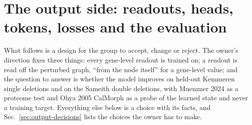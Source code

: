 
\section{The output side: readouts, heads, tokens, losses and the evaluation}
\label{sec:output}

What follows is a design for the group to accept, change or reject. The owner's direction
fixes three things: every gene-level readout is trained on; a readout is read off the
perturbed graph, ``from the node itself'' for a gene-level value; and the question to
answer is whether the model improves on held-out Kemmeren single deletions and on the
Sameith double deletions, with Muenzner 2024 as a proteome test and Ohya 2005 CalMorph as a
probe of the learned state and never a training target. Everything else below is a choice
with its facts, and Sec.~\ref{sec:output-decisions} lists the choices the owner has to make.

